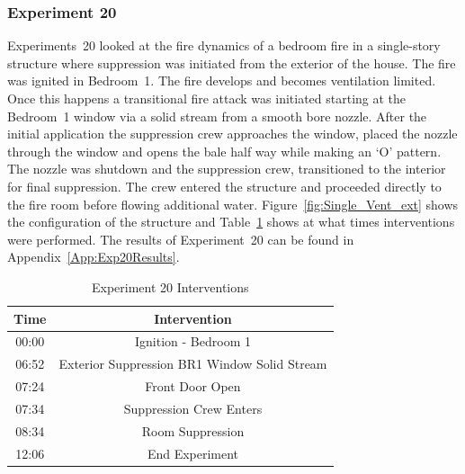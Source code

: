 \documentclass[12pt,oneside]{book}
\begin{document}
\subsubsection{Experiment 20}
Experiments~20 looked at the fire dynamics of a bedroom fire in a single-story structure where suppression was initiated from the exterior of the house. The fire was ignited in Bedroom~1. The fire develops and becomes ventilation limited. Once this happens a transitional fire attack was initiated starting at the Bedroom~1 window via a solid stream from a smooth bore nozzle. After the initial application the suppression crew approaches the window, placed the nozzle through the window and opens the bale half way while making an `O' pattern. The nozzle was shutdown and the suppression crew, transitioned to the interior for final suppression. The crew entered the structure and proceeded directly to the fire room before flowing additional water. Figure~\ref{fig:Single_Vent_ext} shows the configuration of the structure and Table~\ref{Table:Exp20Interventions} shows at what times interventions were performed. The results of Experiment~20 can be found in Appendix~\ref{App:Exp20Results}. 


\begin{table}[H]
	\centering
	\caption{Experiment 20 Interventions}
	\begin{tabular}{|c|c|} 
		\hline
		Time & Intervention \\ \hline \hline
		00:00 & Ignition - Bedroom 1 \\ \hline
		06:52 & Exterior Suppression BR1 Window Solid Stream \\ \hline
		07:24 & Front Door Open \\ \hline
		07:34 & Suppression Crew Enters\\ \hline
		08:34 & Room Suppression \\ \hline 
		12:06 & End Experiment\\ \hline
	\end{tabular}
	\label{Table:Exp20Interventions}
\end{table}

\FloatBarrier
\end{document}
